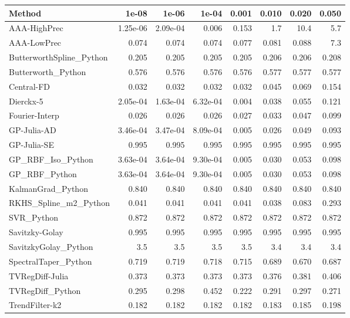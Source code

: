 \begin{longtable}{lrrrrrrr}
\toprule
\textbf{Method} & \textbf{1e-08} & \textbf{1e-06} & \textbf{1e-04} & \textbf{0.001} & \textbf{0.010} & \textbf{0.020} & \textbf{0.050} \\
\midrule
\endhead
AAA-HighPrec & 1.25e-06 & 2.09e-04 & 0.006 & 0.153 & 1.7 & 10.4 & 5.7 \\
AAA-LowPrec & 0.074 & 0.074 & 0.074 & 0.077 & 0.081 & 0.088 & 7.3 \\
ButterworthSpline\_Python & 0.205 & 0.205 & 0.205 & 0.205 & 0.206 & 0.206 & 0.208 \\
Butterworth\_Python & 0.576 & 0.576 & 0.576 & 0.576 & 0.577 & 0.577 & 0.577 \\
Central-FD & 0.032 & 0.032 & 0.032 & 0.032 & 0.045 & 0.069 & 0.154 \\
Dierckx-5 & 2.05e-04 & 1.63e-04 & 6.32e-04 & 0.004 & 0.038 & 0.055 & 0.121 \\
Fourier-Interp & 0.026 & 0.026 & 0.026 & 0.027 & 0.033 & 0.047 & 0.099 \\
GP-Julia-AD & 3.46e-04 & 3.47e-04 & 8.09e-04 & 0.005 & 0.026 & 0.049 & 0.093 \\
GP-Julia-SE & 0.995 & 0.995 & 0.995 & 0.995 & 0.995 & 0.995 & 0.995 \\
GP\_RBF\_Iso\_Python & 3.63e-04 & 3.64e-04 & 9.30e-04 & 0.005 & 0.030 & 0.053 & 0.098 \\
GP\_RBF\_Python & 3.63e-04 & 3.64e-04 & 9.30e-04 & 0.005 & 0.030 & 0.053 & 0.098 \\
KalmanGrad\_Python & 0.840 & 0.840 & 0.840 & 0.840 & 0.840 & 0.840 & 0.840 \\
RKHS\_Spline\_m2\_Python & 0.041 & 0.041 & 0.041 & 0.041 & 0.038 & 0.083 & 0.293 \\
SVR\_Python & 0.872 & 0.872 & 0.872 & 0.872 & 0.872 & 0.872 & 0.872 \\
Savitzky-Golay & 0.995 & 0.995 & 0.995 & 0.995 & 0.995 & 0.995 & 0.995 \\
SavitzkyGolay\_Python & 3.5 & 3.5 & 3.5 & 3.5 & 3.4 & 3.4 & 3.4 \\
SpectralTaper\_Python & 0.719 & 0.719 & 0.718 & 0.715 & 0.689 & 0.670 & 0.687 \\
TVRegDiff-Julia & 0.373 & 0.373 & 0.373 & 0.373 & 0.376 & 0.381 & 0.406 \\
TVRegDiff\_Python & 0.295 & 0.298 & 0.452 & 0.222 & 0.291 & 0.297 & 0.271 \\
TrendFilter-k2 & 0.182 & 0.182 & 0.182 & 0.182 & 0.183 & 0.185 & 0.198 \\

\end{longtable}

